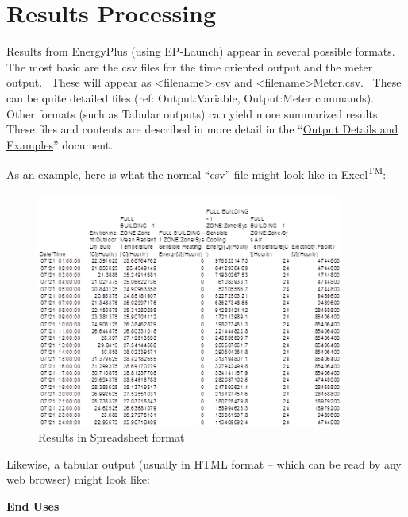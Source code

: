 \section{Results Processing}\label{results-processing}

Results from EnergyPlus (using EP-Launch) appear in several possible formats.~ The most basic are the csv files for the time oriented output and the meter output.~ These will appear as \textless{}filename\textgreater{}.csv and \textless{}filename\textgreater{}Meter.csv.~ These can be quite detailed files (ref: Output:Variable, Output:Meter commands).~ Other formats (such as Tabular outputs) can yield more summarized results.~ These files and contents are described in more detail in the ``\href{OutputDetailsAndExamples.pdf}{Output Details and Examples}'' document.

As an example, here is what the normal ``csv'' file might look like in Excel\textsuperscript{TM}:

\begin{figure}[hbtp] %
\centering
\includegraphics[width=0.9\textwidth, height=0.9\textheight, keepaspectratio=true]{media/image023.png}
\caption{Results in Spreadsheet format \protect \label{fig:results-in-spreadsheet-format}}
\end{figure}

Likewise, a tabular output (usually in HTML format -- which can be read by any web browser) might look like:

\textbf{End Uses}

